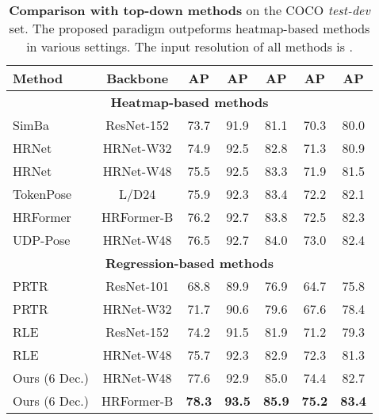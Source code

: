\documentclass[runningheads]{llncs}
\begin{document}
\begin{table}[!t]
    \begin{center}
    \caption{\textbf{Comparison with top-down methods} on the COCO \emph{test-dev} set. The proposed paradigm outpeforms heatmap-based methods in various settings.
The input resolution of all methods is .}
    \resizebox{0.65\linewidth}{!}
    {\begin{tabular}{l|c|c|c|c|c|c}
		\hline
	    Method & Backbone  & AP & AP & AP & AP & AP \\
	    \hline
	    \multicolumn{7}{c}{\textbf{Heatmap-based methods}} \\
	    \hline
SimBa~\cite{xiao2018simple}          & ResNet-152        & 73.7 & 91.9 & 81.1 & 70.3 & 80.0 \\ HRNet~\cite{sun2019deep}                 & HRNet-W32         & 74.9 & 92.5 & 82.8 & 71.3 & 80.9 \\ HRNet~\cite{sun2019deep}                 & HRNet-W48         & 75.5 & 92.5 & 83.3 & 71.9 & 81.5 \\ TokenPose~\cite{li2021tokenpose}                & L/D24             & 75.9 & 92.3 & 83.4 & 72.2 & 82.1 \\ HRFormer~\cite{yuan2021hrformer}              & HRFormer-B        & 76.2 & 92.7 & 83.8 & 72.5 & 82.3 \\ UDP-Pose~\cite{huang2020devil}                  & HRNet-W48         & 76.5 & 92.7 & 84.0 & 73.0 & 82.4 \\ \hline
        \multicolumn{7}{c}{\textbf{Regression-based methods}} \\
	    \hline
	    PRTR~\cite{li2021PRTR}                          & ResNet-101        & 68.8 & 89.9 & 76.9 & 64.7 & 75.8 \\ PRTR~\cite{li2021PRTR}                          & HRNet-W32         & 71.7 & 90.6 & 79.6 & 67.6 & 78.4 \\ RLE~\cite{li2021human}                          & ResNet-152        & 74.2 & 91.5 & 81.9 & 71.2 & 79.3 \\ RLE~\cite{li2021human}                          & HRNet-W48 & 75.7 & 92.3 & 82.9 & 72.3 & 81.3 \\ Ours (6 Dec.)                                  & HRNet-W48         & 77.6 & 92.9 & 85.0 & 74.4 & 82.7 \\
Ours (6 Dec.)                                 & HRFormer-B        & \textbf{78.3} & \textbf{93.5} & \textbf{85.9} & \textbf{75.2}  & \textbf{83.4} \\
    \hline
	\end{tabular}
    }
    \end{center}
\label{tab:comparisons_with_sota_on_coco_test}
\end{table}
\end{document}
